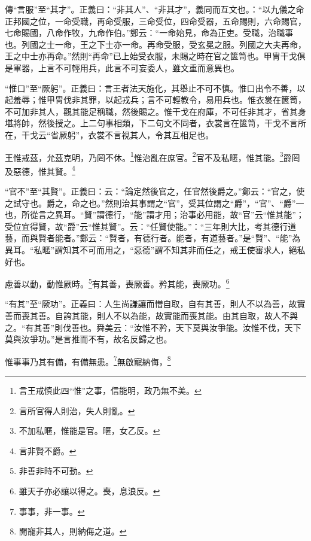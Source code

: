 {\noindent\zhuan{}\fzbyks 傳“言服”至“其才”。正義曰：“非其人”、“非其才”，義同而互文也。：“以九儀之命正邦國之位，一命受職，再命受服，三命受位，四命受器，五命賜則，六命賜官，七命賜國，八命作牧，九命作伯。”鄭云：“一命始見，命為正吏。受職，治職事也。列國之士一命，王之下士亦一命。再命受服，受玄冕之服。列國之大夫再命，王之中士亦再命。”然則“再命”已上始受衣服，未賜之時在官之篋笥也。甲冑干戈俱是軍器，上言不可輕用兵，此言不可妄委人，雖文重而意異也。 \par}

{\noindent\shu{}\fzkt “惟口”至“厥躬”。正義曰：言王者法天施化，其舉止不可不慎。惟口出令不善，以起羞辱；惟甲冑伐非其罪，以起戎兵；言不可輕教令，易用兵也。惟衣裳在篋笥，不可加非其人，觀其能足稱職，然後賜之。惟干戈在府庫，不可任非其才，省其身堪將帥，然後授之。上二句事相類，下二句文不同者，衣裳言在篋笥，干戈不言所在，干戈云“省厥躬”，衣裳不言視其人，令其互相足也。 \par}

王惟戒茲，允茲克明，乃罔不休。\footnote{言王戒慎此四“惟”之事，信能明，政乃無不美。}惟治亂在庶官。\footnote{言所官得人則治，失人則亂。}官不及私暱，惟其能。\footnote{不加私暱，惟能是官。暱，女乙反。}爵罔及惡德，惟其賢。\footnote{言非賢不爵。}

{\noindent\shu{}\fzkt “官不”至“其賢”。正義曰：云：“論定然後官之，任官然後爵之。”鄭云：“官之，使之試守也。爵之，命之也。”然則治其事謂之“官”，受其位謂之“爵”，“官”、“爵”一也，所從言之異耳。“賢”謂德行，“能”謂才用；治事必用能，故“官”云“惟其能”；受位宜得賢，故“爵”云“惟其賢”。云：“任賢使能。”：“三年則大比，考其德行道藝，而與賢者能者。”鄭云：“賢者，有德行者。能者，有道藝者。”是“賢”、“能”為異耳。“私暱”謂知其不可而用之，“惡德”謂不知其非而任之，戒王使審求人，絕私好也。 \par}

慮善以動，動惟厥時。\footnote{非善非時不可動。}有其善，喪厥善。矜其能，喪厥功。\footnote{雖天子亦必讓以得之。喪，息浪反。}

{\noindent\shu{}\fzkt “有其”至“厥功”。正義曰：人生尚謙讓而憎自取，自有其善，則人不以為善，故實善而喪其善。自誇其能，則人不以為能，故實能而喪其能。由其自取，故人不與之。“有其善”則伐善也。舜美云：“汝惟不矜，天下莫與汝爭能。汝惟不伐，天下莫與汝爭功。”是言推而不有，故名反歸之也。 \par}

惟事事乃其有備，有備無患。\footnote{事事，非一事。}無啟寵納侮，\footnote{開寵非其人，則納侮之道。}

